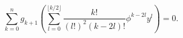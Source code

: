 \begin{equation}
\sum_{k=0}^{n} g_{k+1} \left( \sum_{l=0}^{\lfloor k/2 \rfloor} \frac{k!}{(l!)^2 (k-2l)!} \phi^{k-2l} y^l \right) = 0.
\end{equation}

